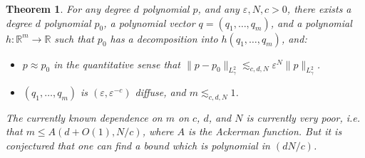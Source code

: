\documentclass[12pt]{article}
\newtheorem{theorem}{Theorem}
\begin{document}
\begin{theorem}
    For any degree $d$ polynomial $p$, and any $\varepsilon,N,c > 0$, there exists a degree $d$ polynomial $p_0$, a polynomial vector $q = (q_1,\dots,q_m)$, and a polynomial $h: \mathbb{R}^m \to \mathbb{R}$ such that $p_0$ has a decomposition into $h(q_1,\dots,q_m)$, and:
    \begin{itemize}
        \item $p \approx p_0$ in the quantitative sense that $\| p - p_0 \|_{L^2_\gamma} \lesssim_{c,d,N} \varepsilon^N \| p \|_{L^2_\gamma}$.

        \item $(q_1,\dots,q_m)$ is $(\varepsilon,\varepsilon^{-c})$ diffuse, and $m \lesssim_{c,d,N} 1$.
    \end{itemize}
    The currently known dependence on $m$ on $c$, $d$, and $N$ is currently very poor, i.e. that $m \leq A(d + O(1), N/c)$, where $A$ is the Ackerman function. But it is conjectured that one can find a bound which is polynomial in $(dN/c)$.
\end{theorem}
\end{document}
